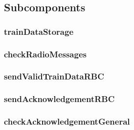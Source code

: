 \subsection{Subcomponents}\label{s:traindata_subcomponents}

\subsubsection{trainDataStorage}


\subsubsection{checkRadioMessages}


\subsubsection{sendValidTrainDataRBC}


\subsubsection{sendAcknowledgementRBC}


\subsubsection{checkAcknowledgementGeneral}




